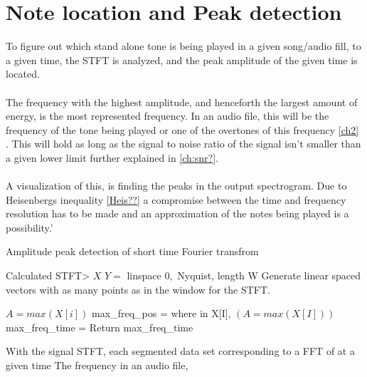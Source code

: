 \section{Note location and Peak detection}

To figure out which stand alone tone is being played in a given song/audio fill, to a given time, the STFT is analyzed, and the peak amplitude of the given time is located.\\
\\

The frequency with the highest amplitude, and henceforth the largest amount of energy, is the most represented frequency. 
In an audio file, this will be the frequency of the tone being played or one of the overtones of this frequency \ref{ch2} .
This will hold as long as the signal to noise ratio of the signal isn't smaller than a given lower limit further explained in \ref{ch:snr?}. 
\\
\\
A visualization of this, is finding the peaks in the output spectrogram.
Due to Heisenbergs inequality \ref{Heis??}  a compromise between the time and frequency resolution has to be made and an approximation of the notes being played is a possibility.'

\begin{algorithm}[H]
\caption{Amplitude peak detection of short time Fourier transfrom}
\label{alg:FIR}
\begin{algorithmic}[1] 
\State  Calculated STFT> $X$ 
\State $Y =$ linspace $0,$ Nyquist, length W \Comment Generate linear spaced vectors with as many points as in the window for the STFT.

		\State $A = max(X[i])$ 
		\State max_freq_pos = where in X[I], $(A = max(X[I]))$ 
		\State max_freq_time = 
	\EndFor
	\State Return max_freq_time
\EndProcedure
{}
\EndProcedure
\end{algorithmic}
\end{algorithm}




With the signal STFT, each segmented data set corresponding to a FFT of at a given time 
The frequency in an audio file, 